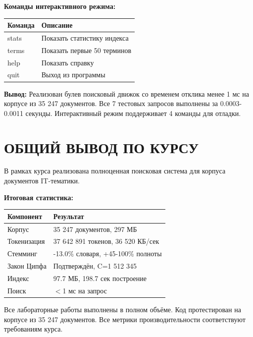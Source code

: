 \documentclass[a4paper, 12pt]{article}
\begin{document}
\textbf{Команды интерактивного режима:}
\begin{table}[h]
\begin{tabular}{|l|l|}
\hline
\textbf{Команда} & \textbf{Описание} \\ \hline
stats & Показать статистику индекса \\ \hline
terms & Показать первые 50 терминов \\ \hline
help & Показать справку \\ \hline
quit & Выход из программы \\ \hline
\end{tabular}
\end{table}

\textbf{Вывод:} Реализован булев поисковый движок со временем отклика менее 1 мс на корпусе из 35 247 документов. Все 7 тестовых запросов выполнены за 0.0003-0.0011 секунды. Интерактивный режим поддерживает 4 команды для отладки.

\newpage

\section*{ОБЩИЙ ВЫВОД ПО КУРСУ}
В рамках курса реализована полноценная поисковая система для корпуса документов IT-тематики.

\textbf{Итоговая статистика:}
\begin{table}[h]
\begin{tabular}{|l|l|}
\hline
\textbf{Компонент} & \textbf{Результат} \\ \hline
Корпус & 35 247 документов, 297 МБ \\ \hline
Токенизация & 37 642 891 токенов, 36 520 КБ/сек \\ \hline
Стемминг & -13.0\% словаря, +45-100\% полноты \\ \hline
Закон Ципфа & Подтверждён, C=1 512 345 \\ \hline
Индекс & 97.7 МБ, 198.7 сек построение \\ \hline
Поиск & $<$1 мс на запрос \\ \hline
\end{tabular}
\end{table}

Все лабораторные работы выполнены в полном объёме. Код протестирован на корпусе из 35 247 документов. Все метрики производительности соответствуют требованиям курса.
\end{document}
